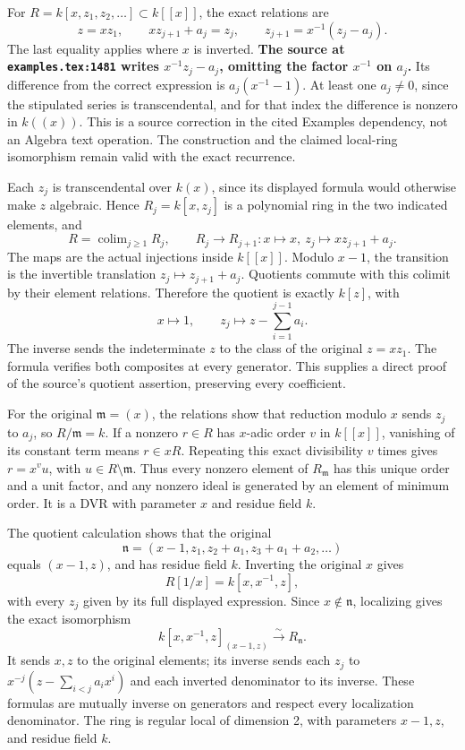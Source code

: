 For \(R=k[x,z_1,z_2,\ldots]\subset k[[x]]\), the exact relations are \[
 z=xz_1,\qquad xz_{j+1}+a_j=z_j,
 \qquad z_{j+1}=x^{-1}(z_j-a_j).
\] The last equality applies where \(x\) is inverted. \textbf{The source at \texttt{examples.tex:1481} writes \(x^{-1}z_j-a_j\), omitting the factor \(x^{-1}\) on \(a_j\).} Its difference from the correct expression is \(a_j(x^{-1}-1)\). At least one \(a_j\ne0\), since the stipulated series is transcendental, and for that index the difference is nonzero in \(k((x))\). This is a source correction in the cited Examples dependency, not an Algebra text operation. The construction and the claimed local-ring isomorphism remain valid with the exact recurrence.

Each \(z_j\) is transcendental over \(k(x)\), since its displayed formula would otherwise make \(z\) algebraic. Hence \(R_j=k[x,z_j]\) is a polynomial ring in the two indicated elements, and \[
 R=\operatorname{colim}_{j\ge1}R_j,\qquad
 R_j\to R_{j+1}:x\mapsto x,\ z_j\mapsto xz_{j+1}+a_j.
\] The maps are the actual injections inside \(k[[x]]\). Modulo \(x-1\), the transition is the invertible translation \(z_j\mapsto z_{j+1}+a_j\). Quotients commute with this colimit by their element relations. Therefore the quotient is exactly \(k[z]\), with \[
 x\mapsto1,\qquad z_j\mapsto z-\sum_{i=1}^{j-1}a_i.
\] The inverse sends the indeterminate \(z\) to the class of the original \(z=xz_1\). The formula verifies both composites at every generator. This supplies a direct proof of the source's quotient assertion, preserving every coefficient.

For the original \(\mathfrak m=(x)\), the relations show that reduction modulo \(x\) sends \(z_j\) to \(a_j\), so \(R/\mathfrak m=k\). If a nonzero \(r\in R\) has \(x\)-adic order \(v\) in \(k[[x]]\), vanishing of its constant term means \(r\in xR\). Repeating this exact divisibility \(v\) times gives \(r=x^vu\), with \(u\in R\setminus\mathfrak m\). Thus every nonzero element of \(R_{\mathfrak m}\) has this unique order and a unit factor, and any nonzero ideal is generated by an element of minimum order. It is a DVR with parameter \(x\) and residue field \(k\).

The quotient calculation shows that the original \[
 \mathfrak n=(x-1,z_1,z_2+a_1,z_3+a_1+a_2,\ldots)
\] equals \((x-1,z)\), and has residue field \(k\). Inverting the original \(x\) gives \[
 R[1/x]=k[x,x^{-1},z],
\] with every \(z_j\) given by its full displayed expression. Since \(x\notin\mathfrak n\), localizing gives the exact isomorphism \[
 k[x,x^{-1},z]_{(x-1,z)}\xrightarrow{\sim}R_{\mathfrak n}.
\] It sends \(x,z\) to the original elements; its inverse sends each \(z_j\) to \(x^{-j}(z-\sum_{i<j}a_ix^i)\) and each inverted denominator to its inverse. These formulas are mutually inverse on generators and respect every localization denominator. The ring is regular local of dimension 2, with parameters \(x-1,z\), and residue field \(k\).

